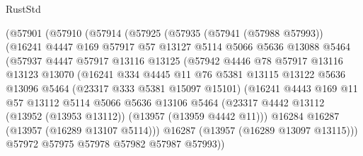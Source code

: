 \begin{lexlean}{RustStd}
\begin{coremodule}
              (@57901
                (@57910
                  (@57914
                    (@57925
                      (@57935
                        (@57941 (@57988 @57993))
                        (@16241
                          @4447
                          @169
                          @57917
                          @57
                          @13127
                          @5114
                          @5066
                          @5636
                          @13088
                          @5464
                          (@57937
                            @4447
                            @57917
                            @13116
                            @13125
                            (@57942
                              @4446
                              @78
                              @57917
                              @13116
                              @13123
                              @13070
                              (@16241
                                @334
                                @4445
                                @11
                                @76
                                @5381
                                @13115
                                @13122
                                @5636
                                @13096
                                @5464
                                (@23317 @333 @5381 @15097 @15101)
                                (@16241
                                  @4443
                                  @169
                                  @11
                                  @57
                                  @13112
                                  @5114
                                  @5066
                                  @5636
                                  @13106
                                  @5464
                                  (@23317
                                    @4442
                                    @13112
                                    (@13952 (@13953 @13112))
                                    (@13957 (@13959 @4442 @11)))
                                  @16284
                                  @16287
                                  (@13957 (@16289 @13107 @5114)))
                                @16287
                                (@13957 (@16289 @13097 @13115)))
                              @57972
                              @57975
                              @57978
                              @57982
                              @57987
                              @57993))

\end{coremodule}
\end{lexlean}
